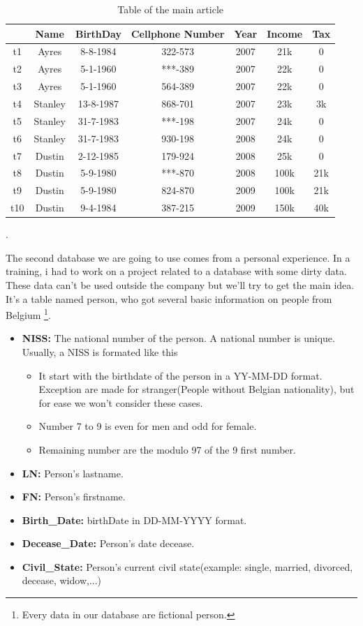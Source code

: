 \documentclass[letterpaper, 12pt]{report}
\begin{document}
\begin{table}[H]
	\centering
	\begin{tabular}{|c|c c c c c c|}
	\hline
	    & Name & BirthDay & Cellphone Number & Year & Income & Tax\\
	\hline
	 t1 & Ayres & 8-8-1984 & 322-573 & 2007 & 21k & 0\\
	 t2 & Ayres & 5-1-1960 & ***-389 & 2007 & 22k & 0 \\
	 t3 & Ayres & 5-1-1960 & 564-389 & 2007 & 22k & 0 \\
	 t4 & Stanley & 13-8-1987 & 868-701 & 2007 & 23k & 3k\\
	 t5 & Stanley & 31-7-1983 & ***-198 & 2007 & 24k & 0\\
	 t6 & Stanley & 31-7-1983 & 930-198 & 2008 & 24k & 0\\
	 t7 & Dustin & 2-12-1985 & 179-924 & 2008 & 25k & 0 \\
	 t8 & Dustin & 5-9-1980 & ***-870 & 2008 & 100k & 21k \\
	 t9 & Dustin & 5-9-1980 & 824-870 & 2009 & 100k & 21k \\
	 t10 & Dustin & 9-4-1984 & 387-215 & 2009 & 150k & 40k \\
	 \hline
	\end{tabular}
	\caption{\label{tableMain} Table of the main article\cite{main}}.
\end{table}

The second database we are going to use comes from a personal experience. In a training, i had to work on a project related to a database with some dirty data. These data can't be used outside the company but we'll try to get the main idea. It's a table named person, who got several basic information on people from Belgium \footnote{Every data in our database are fictional person.}.
\begin{itemize}
\item \textbf{NISS:} The national number of the person. A national number is unique. Usually, a NISS is formated like this\cite{bcss}
	\begin{itemize}
	\item It start with the birthdate of the person in a YY-MM-DD format. Exception are made for stranger(People without Belgian nationality), but for ease we won't consider these cases.
	\item Number 7 to 9 is even for men and odd for female.
	\item Remaining number are the modulo 97 of the 9 first number. 
	\end{itemize}
\item \textbf{LN:} Person's lastname.
\item \textbf{FN:} Person's firstname.
\item \textbf{Birth\_Date:} birthDate in DD-MM-YYYY format.
\item \textbf{Decease\_Date:} Person's date decease.
\item \textbf{Civil\_State:} Person's current civil state(example: single, married, divorced, decease, widow,...)
\end{itemize}
\end{document}
